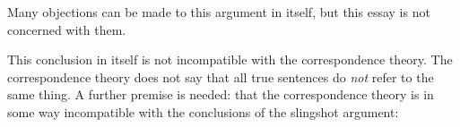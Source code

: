 Many objections can be made to this argument in itself, but this essay is not concerned with them.





This conclusion in itself is not incompatible with the correspondence theory.
The correspondence theory does not say that all true sentences do \emph{not} refer to the same thing.
A further premise is needed: that the correspondence theory is in some way incompatible with the conclusions of the slingshot argument:


